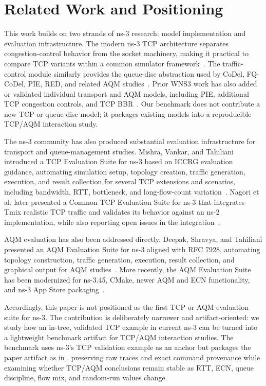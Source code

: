 \section{Related Work and Positioning}

This work builds on two strands of ns-3 research: model implementation and evaluation infrastructure. The modern ns-3 TCP architecture separates congestion-control behavior from the socket machinery, making it practical to compare TCP variants within a common simulator framework~\cite{Casoni2016NextGenerationTcp}. The traffic-control module similarly provides the queue-disc abstraction used by CoDel, FQ-CoDel, PIE, RED, and related AQM studies~\cite{Imputato2016TrafficControl}. Prior WNS3 work has also added or validated individual transport and AQM models, including PIE, additional TCP congestion controls, and TCP BBR~\cite{Shravya2016Pie,Nguyen2016TcpVariants,Jain2018Bbr}. Our benchmark does not contribute a new TCP or queue-disc model; it packages existing models into a reproducible TCP/AQM interaction study.

The ns-3 community has also produced substantial evaluation infrastructure for transport and queue-management studies. Mishra, Vankar, and Tahiliani introduced a TCP Evaluation Suite for ns-3 based on ICCRG evaluation guidance, automating simulation setup, topology creation, traffic generation, execution, and result collection for several TCP extensions and scenarios, including bandwidth, RTT, bottleneck, and long-flow-count variation~\cite{Mishra2016TcpEval}. Nagori et al. later presented a Common TCP Evaluation Suite for ns-3 that integrates Tmix realistic TCP traffic and validates its behavior against an ns-2 implementation, while also reporting open issues in the integration~\cite{Nagori2017CommonTcpEval}.

AQM evaluation has also been addressed directly. Deepak, Shravya, and Tahiliani presented an AQM Evaluation Suite for ns-3 aligned with RFC 7928, automating topology construction, traffic generation, execution, result collection, and graphical output for AQM studies~\cite{Deepak2017AqmEval,Kuhn2016Rfc7928}. More recently, the AQM Evaluation Suite has been modernized for ns-3.45, CMake, newer AQM and ECN functionality, and ns-3 App Store packaging~\cite{Ns3AppStore2025AqmEval,Lin2025GSoCAqmEval}.

Accordingly, this paper is not positioned as the first TCP or AQM evaluation suite for ns-3. The contribution is deliberately narrower and artifact-oriented: we study how an in-tree, validated TCP example in current ns-3 can be turned into a lightweight benchmark artifact for TCP/AQM interaction studies. The benchmark uses ns-3's TCP validation example as an anchor but packages the paper artifact as \TcpAqmBenchmark{} in \TcpAqmModule{}, preserving raw traces and exact command provenance while examining whether TCP/AQM conclusions remain stable as RTT, ECN, queue discipline, flow mix, and random-run values change.

